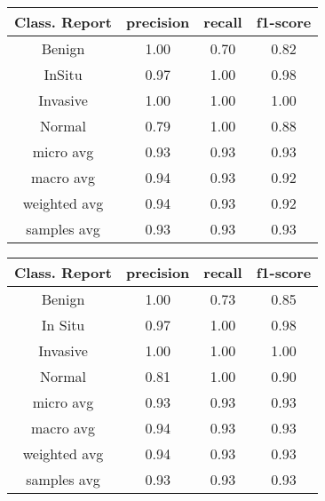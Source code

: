\documentclass[a4paper, 12 pt, conference]{ieeeconf}
\begin{document}
\begin{minipage}[htbp]{\linewidth}
\centering
{} \label{tab:avgcr}
\begin{tabular}{|c|c|c|c|} \toprule[0.8pt]
\hline
{Class. Report} & precision  &  recall & f1-score \\
\hline
Benign    &   1.00   &   0.70   &   0.82   \\
\hline
InSitu   &    0.97   &   1.00   &   0.98   \\
\hline
Invasive   &    1.00   &   1.00   &   1.00  \\
\hline
Normal   &    0.79    &  1.00   &   0.88   \\
\hline
micro avg    &   0.93   &   0.93  &    0.93  \\
\hline
macro avg    &   0.94   &   0.93   &   0.92  \\
\hline
weighted avg    &   0.94   &   0.93  &    0.92   \\
\hline
samples avg    &   0.93   &   0.93   &   0.93  \\
\hline
\bottomrule[0.8pt]
\end{tabular}
\end{minipage}

\vspace{\baselineskip}


\begin{minipage}[htbp]{\linewidth}
\centering
{} \label{tab:prpcr1}
\begin{tabular}{|c|c|c|c|} \toprule[0.8pt]
\hline
{Class. Report} & precision & recall & f1-score \\
\hline
Benign    &   1.00   &   0.73    &  0.85 \\
\hline
In Situ    &   0.97   &   1.00    &  0.98 \\
\hline
Invasive    &   1.00   &   1.00    &  1.00 \\
\hline
Normal    &   0.81   &   1.00    &  0.90 \\
\hline

micro avg    &   0.93   &   0.93    &  0.93 \\
\hline
macro avg    &   0.94   &   0.93    &  0.93 \\
\hline
weighted avg    &   0.94   &   0.93    &  0.93 \\
\hline
samples avg    &   0.93   &   0.93    &  0.93 \\
\hline
\bottomrule[0.8pt]
\end{tabular}
\end{minipage}
\end{document}
